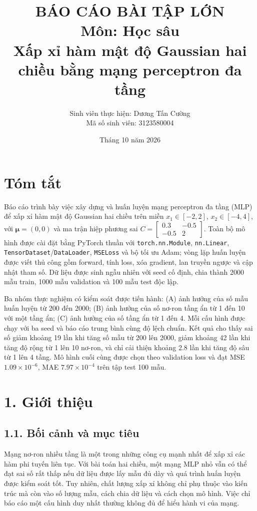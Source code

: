 \documentclass[12pt,a4paper]{article}
\title{\textbf{BÁO CÁO BÀI TẬP LỚN}\\ Môn: Học sâu\\ Xấp xỉ hàm mật độ Gaussian hai chiều bằng mạng perceptron đa tầng}
\author{Sinh viên thực hiện: Dương Tấn Cường\\ Mã số sinh viên: 3123580004}
\date{Tháng 10 năm 2026}
\begin{document}
\maketitle

\section*{Tóm tắt}

Báo cáo trình bày việc xây dựng và huấn luyện mạng perceptron đa tầng (MLP) để xấp xỉ hàm mật độ Gaussian hai chiều trên miền $x_1 \in [-2, 2]$, $x_2 \in [-4, 4]$, với $\boldsymbol{\mu} = (0, 0)$ và ma trận hiệp phương sai $C = \begin{bmatrix}0.3 & -0.5\\ -0.5 & 2\end{bmatrix}$. Toàn bộ mô hình được cài đặt bằng PyTorch thuần với \texttt{torch.nn.Module}, \texttt{nn.Linear}, \texttt{TensorDataset}/\texttt{DataLoader}, \texttt{MSELoss} và bộ tối ưu Adam; vòng lặp huấn luyện được viết thủ công gồm forward, tính loss, xóa gradient, lan truyền ngược và cập nhật tham số. Dữ liệu được sinh ngẫu nhiên với seed cố định, chia thành 2000 mẫu train, 1000 mẫu validation và 100 mẫu test độc lập.

Ba nhóm thực nghiệm có kiểm soát được tiến hành: (A) ảnh hưởng của số mẫu huấn luyện từ 200 đến 2000; (B) ảnh hưởng của số nơ-ron tầng ẩn từ 1 đến 10 với một tầng ẩn; (C) ảnh hưởng của số tầng ẩn từ 1 đến 4. Mỗi cấu hình được chạy với ba seed và báo cáo trung bình cùng độ lệch chuẩn. Kết quả cho thấy sai số giảm khoảng 19 lần khi tăng số mẫu từ 200 lên 2000, giảm khoảng 42 lần khi tăng độ rộng từ 1 lên 10 nơ-ron, và chỉ cải thiện khoảng 2.8 lần khi tăng độ sâu từ 1 lên 4 tầng. Mô hình cuối cùng được chọn theo validation loss và đạt MSE $1.09\times10^{-6}$, MAE $7.97\times10^{-4}$ trên tập test 100 mẫu.

\section{1. Giới thiệu}

\subsection{1.1. Bối cảnh và mục tiêu}

Mạng nơ-ron nhiều tầng là một trong những công cụ mạnh nhất để xấp xỉ các hàm phi tuyến liên tục. Với bài toán hai chiều, một mạng MLP nhỏ vẫn có thể đạt sai số rất thấp nếu dữ liệu được lấy mẫu đủ dày và quá trình huấn luyện được kiểm soát tốt. Tuy nhiên, chất lượng xấp xỉ không chỉ phụ thuộc vào kiến trúc mà còn vào số lượng mẫu, cách chia dữ liệu và cách chọn mô hình. Việc chỉ báo cáo một cấu hình duy nhất thường không đủ để hiểu hành vi của mạng.
\end{document}
